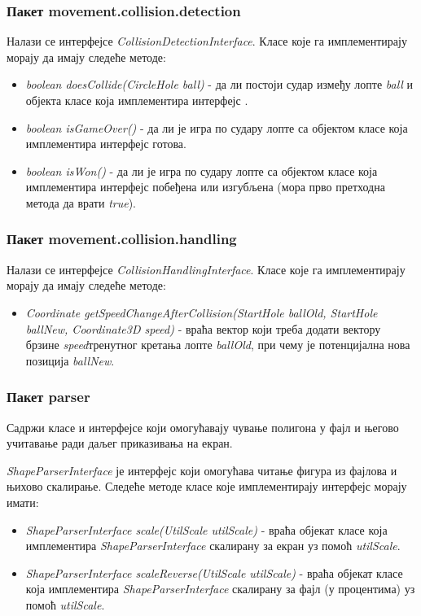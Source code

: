 \subsubsection{Пакет movement.collision.detection}
Налази се интерфејсе \emph{CollisionDetectionInterface}. Класе које га имплементирају морају да имају следеће методе:
\begin{itemize}
\item \emph{boolean doesCollide(CircleHole ball)} - да ли постоји судар између лопте \emph{ball} и објекта класе која имплементира интерфејс .
\item \emph{boolean isGameOver()} - да ли је игра по судару лопте са  објектом класе која имплементира интерфејс готова.
\item \emph{boolean isWon()} - да ли је игра по судару лопте са  објектом класе  која имплементира интерфејс побеђена или изгубљена (мора прво претходна метода да врати \emph{true}).
\end{itemize}
\subsubsection{Пакет movement.collision.handling}
Налази се интерфејсе \emph{CollisionHandlingInterface}. Класе које га имплементирају морају да имају следеће методе:
\begin{itemize}
\item \emph{Coordinate getSpeedChangeAfterCollision(StartHole ballOld, StartHole ballNew, Coordinate3D speed)} - враћа вектор који треба додати вектору брзине \emph{speed}тренутног кретања лопте \emph{ballOld}, при чему је потенцијална нова позиција \emph{ballNew}. 
\end{itemize}

\subsubsection{Пакет parser}
	
Садржи класе и интерфејсе који омогућавају чување полигона у фајл и његово учитавање ради даљег приказивања на екран.

\emph{ShapeParserInterface} је интерфејс који омогућава читање фигура из фајлова и њихово скалирање. Следеће методе класе које имплементирају интерфејс морају имати:
\begin{itemize}
\item \emph{ShapeParserInterface scale(UtilScale utilScale)} - враћа објекат класе која имплементира \emph{ShapeParserInterface} скалирану за екран уз помоћ \emph{utilScale}.
\item \emph{ShapeParserInterface scaleReverse(UtilScale utilScale)} - враћа објекат класе која имплементира \emph{ShapeParserInterface} скалирану за фајл (у процентима) уз помоћ \emph{utilScale}.
\end{itemize}

